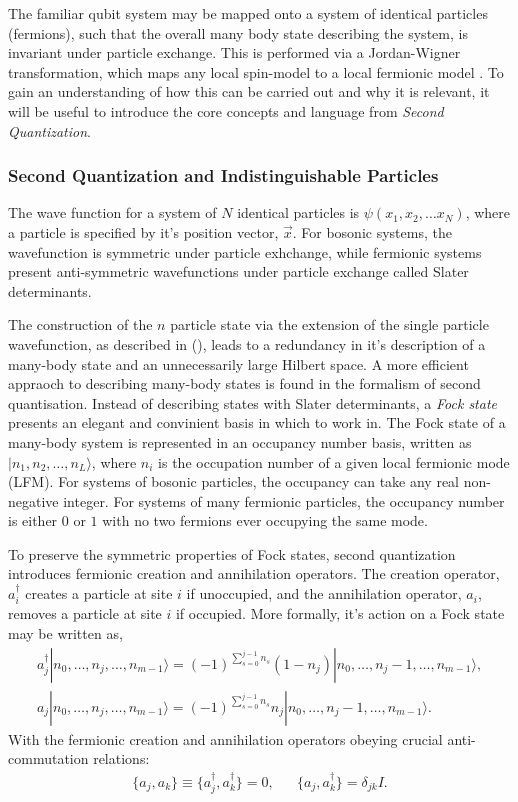 


The familiar qubit system may be mapped onto a system of identical particles (fermions), such that the 
overall many body state describing the system, is invariant under particle exchange. This is 
performed via a Jordan-Wigner transformation, which maps any local spin-model to a local fermionic model \cite{10.1093/acprof:oso/9780199573127.001.0001}.
To gain an understanding of how this can be carried out and why it is relevant, it will be useful to introduce the core concepts and language from \textit{Second Quantization}.
\subsubsection{Second Quantization and Indistinguishable Particles}
The wave function for a system of $N$ identical particles is $\psi(x_1, x_2, \dots x_N)$, where a particle is specified by it's position vector, $\vec{x}$. For bosonic systems, the wavefunction is symmetric under particle exhchange, while fermionic systems present anti-symmetric wavefunctions under particle exchange called Slater determinants. 

The construction of the $n$ particle state via the extension of the single particle wavefunction, as described in (), 
leads to a redundancy in it's description of a many-body state and an unnecessarily large Hilbert space.
A more efficient appraoch to describing many-body states is found in the formalism of second quantisation. Instead of describing states with Slater determinants, a \textit{Fock state} presents an elegant and convinient basis in which to work in. The Fock state of a many-body system is represented in an occupancy number basis, written as $|n_1, n_2, \dots, n_L\rangle$, where $n_i$ is the occupation number of a given local fermionic mode (LFM). For systems of bosonic particles,  the occupancy can take any real non-negative integer. For systems of many fermionic particles, the occupancy number is either $0$ or $1$ with no two fermions ever occupying the same mode.

To preserve the symmetric properties of Fock states, second quantization introduces fermionic creation and annihilation operators. The creation operator, $a^{\dagger}_{i}$ creates a particle at site $i$ if unoccupied, and the annihilation operator, $a_i$, removes a particle at site $i$ if occupied. More formally, it's action on a Fock state may be written as, 
\begin{align}
    a_j^{\dagger} |n_0, \dots, n_j, \dots, n_{m-1}\rangle = {(-1)}^{\sum^{j-1}_{s=0}n_s} (1-n_j) |n_0, \dots, n_j - 1, \dots, n_{m-1}\rangle, \\
    a_j |n_0, \dots, n_j, \dots, n_{m-1}\rangle = {(-1)}^{\sum^{j-1}_{s=0}n_s} n_j |n_0, \dots, n_j - 1, \dots, n_{m-1}\rangle.
\end{align}
With the fermionic creation and annihilation operators obeying crucial anti-commutation relations:
\begin{align}
    \{a_j, a_k\} \equiv \{a_j^{\dagger}, a_k^{\dagger}\} = 0, && \{a_j, a_k^{\dagger}\} = \delta_{jk}I.
\end{align}

